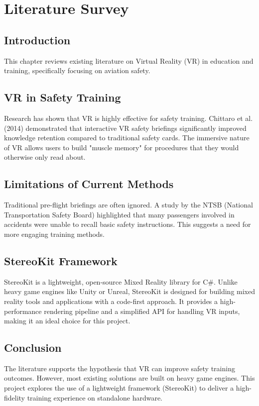 \chapter{Literature Survey}

\section{Introduction}
This chapter reviews existing literature on Virtual Reality (VR) in education and training, specifically focusing on aviation safety.

\section{VR in Safety Training}
Research has shown that VR is highly effective for safety training. Chittaro et al. (2014) demonstrated that interactive VR safety briefings significantly improved knowledge retention compared to traditional safety cards. The immersive nature of VR allows users to build "muscle memory" for procedures that they would otherwise only read about.

\section{Limitations of Current Methods}
Traditional pre-flight briefings are often ignored. A study by the NTSB (National Transportation Safety Board) highlighted that many passengers involved in accidents were unable to recall basic safety instructions. This suggests a need for more engaging training methods.

\section{StereoKit Framework}
StereoKit is a lightweight, open-source Mixed Reality library for C\#. Unlike heavy game engines like Unity or Unreal, StereoKit is designed for building mixed reality tools and applications with a code-first approach. It provides a high-performance rendering pipeline and a simplified API for handling VR inputs, making it an ideal choice for this project.

\section{Conclusion}
The literature supports the hypothesis that VR can improve safety training outcomes. However, most existing solutions are built on heavy game engines. This project explores the use of a lightweight framework (StereoKit) to deliver a high-fidelity training experience on standalone hardware.
